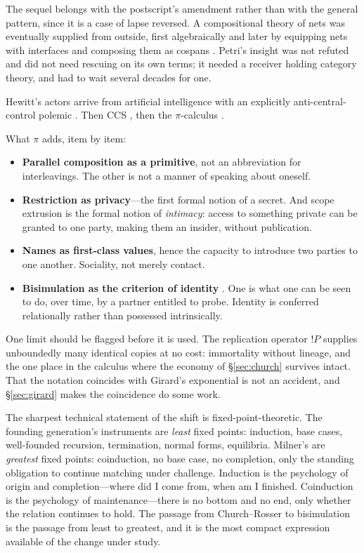 \documentclass[11pt,a4paper]{article}
\begin{document}
The sequel belongs with the postscript's amendment rather than with the general
pattern, since it is a case of lapse reversed. A compositional theory of nets was
eventually supplied from outside, first algebraically \cite{meseguer1990} and
later by equipping nets with interfaces and composing them as cospans
\cite{baez2020}. Petri's insight was not refuted and did not need rescuing on its
own terms; it needed a receiver holding category theory, and had to wait several
decades for one.

Hewitt's actors arrive from artificial intelligence with an
explicitly anti-central-control polemic \cite{hewitt1973}. Then CCS
\cite{milner1980}, then the $\pi$-calculus \cite{milner1992}.

What $\pi$ adds, item by item:

\begin{itemize}[leftmargin=1.4em,itemsep=0.15em]
\item \textbf{Parallel composition as a primitive}, not an abbreviation for
interleavings. The other is not a manner of speaking about oneself.
\item \textbf{Restriction as privacy}---the first formal notion of a secret. And
scope extrusion is the formal notion of \emph{intimacy}: access to something
private can be granted to one party, making them an insider, without publication.
\item \textbf{Names as first-class values}, hence the capacity to introduce two
parties to one another. Sociality, not merely contact.
\item \textbf{Bisimulation as the criterion of identity} \cite{park1981}. One is
what one can be seen to do, over time, by a partner entitled to probe. Identity is
conferred relationally rather than possessed intrinsically.
\end{itemize}

One limit should be flagged before it is used. The replication operator $!P$
supplies unboundedly many identical copies at no cost: immortality without
lineage, and the one place in the calculus where the economy of
\S\ref{sec:church} survives intact. That the notation coincides with Girard's
exponential is not an accident, and \S\ref{sec:girard} makes the coincidence do
some work.

The sharpest technical statement of the shift is fixed-point-theoretic. The
founding generation's instruments are \emph{least} fixed points: induction, base
cases, well-founded recursion, termination, normal forms, equilibria. Milner's are
\emph{greatest} fixed points: coinduction, no base case, no completion, only the
standing obligation to continue matching under challenge. Induction is the
psychology of origin and completion---where did I come from, when am I finished.
Coinduction is the psychology of maintenance---there is no bottom and no end,
only whether the relation continues to hold. The passage from Church--Rosser to
bisimulation is the passage from least to greatest, and it is the most compact
expression available of the change under study.
\end{document}
